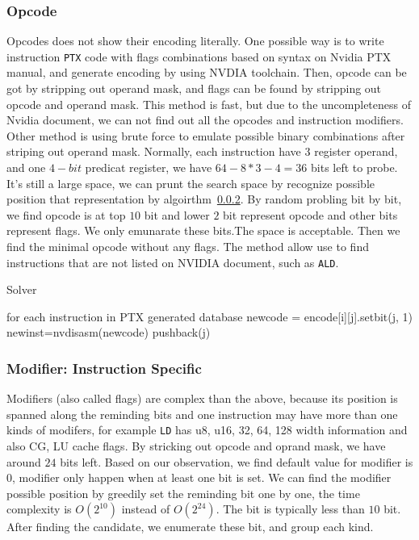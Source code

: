 \documentclass{sig-alternate-05-2015}
\begin{document}
\subsubsection{Opcode}
Opcodes does not show their encoding literally. One possible way is to write instruction {\tt PTX} code with flags
combinations based on syntax on Nvidia PTX manual, and generate encoding by using NVDIA toolchain.
Then, opcode can be got by stripping out operand mask, and flags can be found by stripping out opcode and operand mask.
This method is fast, but due to the uncompleteness of Nvidia document, we can not find out all the opcodes and
instruction modifiers.
Other method is using brute force to emulate possible binary combinations after striping out operand mask.
Normally, each instruction have $3$ register operand, and one $4-bit$ predicat register, we have $64-8*3-4=36$ bits left to probe.
It's still a large space,  we can prunt the search space by recognize possible position that representation by
algoirthm~\ref{}. By random probling bit by bit, we find opcode is at top $10$ bit and lower $2$ bit represent opcode and other bits represent flags. We only
emunarate these bits.The space is acceptable. Then we find the minimal opcode without any flags. The method allow use to find instructions
that are not listed on NVIDIA document, such as {\tt ALD}.

\begin{algorithm}
      \caption{Solver}\label{opcode}
  \begin{algorithmic}[1]
      \State for each instruction in PTX generated database
      \State newcode = encode[i][j].setbit(j, 1)
      \State newinst=nvdisasm(newcode)
      \State pushback(j)
      \EndIf
      \EndIf
      \EndFor
      \EndFor
  \end{algorithmic}
\end{algorithm}

\subsubsection{Modifier: Instruction Specific}
Modifiers (also called flags) are complex than the above, because its position is spanned along the reminding bits and one instruction may have
more than one kinds of modifers, for example {\tt LD} has u8, u16, 32, 64, 128 width information and also CG, LU cache
flags. By stricking out opcode and oprand mask, we have around $24$ bits left. Based on our observation, we find
default value for modifier is $0$, modifier only happen when at least one bit is set. We can find the modifier possible position
by greedily set the reminding bit one by one, the time complexity is $O(2^{10})$ instead of $O(2^{24})$. The bit is typically less
than $10$ bit. After finding the candidate, we enumerate these bit, and group each kind.
\end{document}
